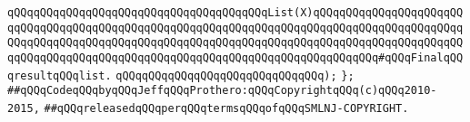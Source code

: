 \verb|qQQqqQQqqQQqqQQqqQQqqQQqqQQqqQQqqQQqqQQqList(X)qQQqqQQqqQQqqQQqqQQqqQQqqQQqqQQqqQQqqQQqqQQqqQQqqQQqqQQqqQQqqQQqqQQqqQQqqQQqqQQqqQQqqQQqqQQqqQQqqQQqqQQqqQQqqQQqqQQqqQQqqQQqqQQqqQQqqQQqqQQqqQQqqQQqqQQqqQQqqQQqqQQqqQQqqQQqqQQqqQQqqQQqqQQqqQQqqQQqqQQqqQQqqQQqqQQqqQQqqQQq#qQQqFinalqQQqresultqQQqlist.|\newline
\verb|qQQqqQQqqQQqqQQqqQQqqQQqqQQqqQQq);|\newline
\verb|};|\newline
\newline
\newline
\verb|##qQQqCodeqQQqbyqQQqJeffqQQqProthero:qQQqCopyrightqQQq(c)qQQq2010-2015,|\newline
\verb|##qQQqreleasedqQQqperqQQqtermsqQQqofqQQqSMLNJ-COPYRIGHT.|\newline

